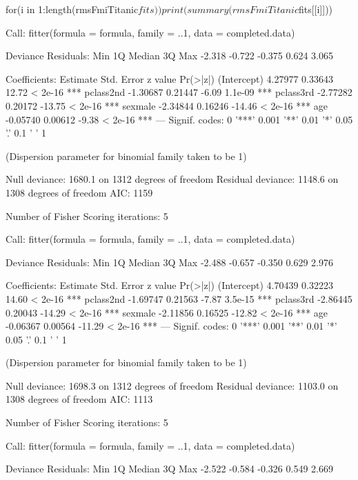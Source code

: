 \begin{Schunk}
\begin{Sinput}
 for(i in 1:length(rmsFmiTitanic$fits)) print(summary(rmsFmiTitanic$fits[[i]]))
\end{Sinput}
\begin{Soutput}
Call:
fitter(formula = formula, family = ..1, data = completed.data)

Deviance Residuals: 
   Min      1Q  Median      3Q     Max  
-2.318  -0.722  -0.375   0.624   3.065  

Coefficients:
            Estimate Std. Error z value Pr(>|z|)    
(Intercept)  4.27977    0.33643   12.72  < 2e-16 ***
pclass2nd   -1.30687    0.21447   -6.09  1.1e-09 ***
pclass3rd   -2.77282    0.20172  -13.75  < 2e-16 ***
sexmale     -2.34844    0.16246  -14.46  < 2e-16 ***
age         -0.05740    0.00612   -9.38  < 2e-16 ***
---
Signif. codes:  0 '***' 0.001 '**' 0.01 '*' 0.05 '.' 0.1 ' ' 1

(Dispersion parameter for binomial family taken to be 1)

    Null deviance: 1680.1  on 1312  degrees of freedom
Residual deviance: 1148.6  on 1308  degrees of freedom
AIC: 1159

Number of Fisher Scoring iterations: 5


Call:
fitter(formula = formula, family = ..1, data = completed.data)

Deviance Residuals: 
   Min      1Q  Median      3Q     Max  
-2.488  -0.657  -0.350   0.629   2.976  

Coefficients:
            Estimate Std. Error z value Pr(>|z|)    
(Intercept)  4.70439    0.32223   14.60  < 2e-16 ***
pclass2nd   -1.69747    0.21563   -7.87  3.5e-15 ***
pclass3rd   -2.86445    0.20043  -14.29  < 2e-16 ***
sexmale     -2.11856    0.16525  -12.82  < 2e-16 ***
age         -0.06367    0.00564  -11.29  < 2e-16 ***
---
Signif. codes:  0 '***' 0.001 '**' 0.01 '*' 0.05 '.' 0.1 ' ' 1

(Dispersion parameter for binomial family taken to be 1)

    Null deviance: 1698.3  on 1312  degrees of freedom
Residual deviance: 1103.0  on 1308  degrees of freedom
AIC: 1113

Number of Fisher Scoring iterations: 5


Call:
fitter(formula = formula, family = ..1, data = completed.data)

Deviance Residuals: 
   Min      1Q  Median      3Q     Max  
-2.522  -0.584  -0.326   0.549   2.669  


\end{Soutput}
\end{Schunk}
